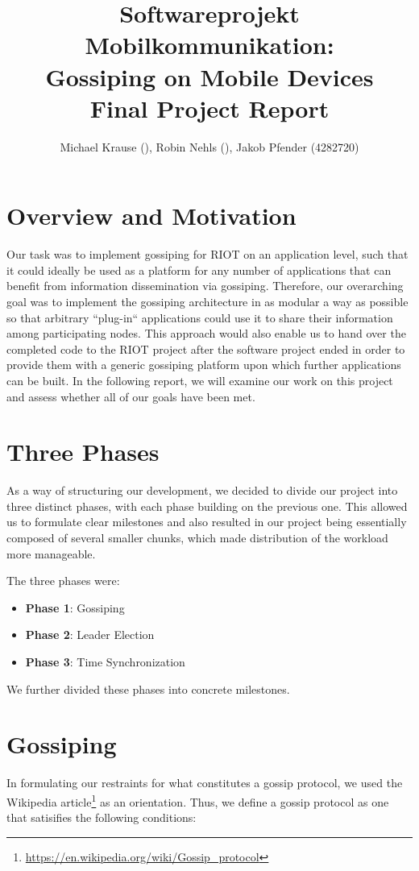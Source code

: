 \documentclass[11pt,
  a4paper,
  ngerman,
  BCOR=7mm
]{scrartcl}
\author{Michael Krause (), Robin Nehls (), Jakob Pfender (4282720)}
\title{Softwareprojekt Mobilkommunikation:\\Gossiping on Mobile
Devices\\Final Project Report}
\begin{document}
\maketitle

\newpage

\section*{Overview and Motivation}
\label{sec:overview_motivation}
Our task was to implement gossiping for RIOT on an application level,
such that it could ideally be used as a platform for any number of
applications that can benefit from information dissemination via
gossiping. Therefore, our overarching goal was to implement the
gossiping architecture in as modular a way as possible so that arbitrary
``plug-in`` applications could use it to share their information among
participating nodes. This approach would also enable us to hand over the
completed code to the RIOT project after the software project ended in
order to provide them with a generic gossiping platform upon which
further applications can be built. In the following report, we will
examine our work on this project and assess whether all of our goals
have been met.

\section*{Three Phases}
\label{sec:three_phases}
As a way of structuring our development, we decided to divide our
project into three distinct phases, with each phase building on the
previous one. This allowed us to formulate clear milestones and also
resulted in our project being essentially composed of several smaller
chunks, which made distribution of the workload more manageable.

The three phases were:

\begin{itemize}
  \item \textbf{Phase 1}: Gossiping
  \item \textbf{Phase 2}: Leader Election
  \item \textbf{Phase 3}: Time Synchronization
\end{itemize}

We further divided these phases into concrete milestones.

\newpage

\section*{Gossiping}
\label{sec:gossiping}
In formulating our restraints for what constitutes a gossip protocol, we
used the Wikipedia
article\footnote{\url{https://en.wikipedia.org/wiki/Gossip_protocol}}
as an orientation. Thus, we define a gossip protocol as one that
satisifies the following conditions:
\end{document}
